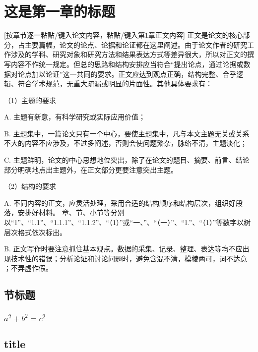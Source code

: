 \chapter{这是第一章的标题}
[按章节逐一粘贴/键入论文内容，粘贴/键入第1章正文内容]
正文是论文的核心部分，占主要篇幅，论文的论点、论据和论证都在这里阐述。由于论文作者的研究工作涉及的学科、研究对象和研究方法和结果表达方式等差异很大，所以对正文的撰写内容不作统一规定。但总的思路和结构安排应当符合“提出论点，通过论据或数据对论点加以论证”这一共同的要求。正文应达到观点正确，结构完整、合乎逻辑、符合学术规范，无重大疏漏或明显的片面性。其他具体要求有：

（1）主题的要求

A.	主题有新意，有科学研究或实际应用价值；

B.	主题集中，一篇论文只有一个中心，要使主题集中，凡与本文主题无关或关系不大的内容不应涉及，不过多阐述，否则会使问题繁杂，脉络不清，主题淡化；

C.	主题鲜明，论文的中心思想地位突出，除了在论文的题目、摘要、前言、结论部分明确地点出主题外，在正文部分更要注意突出主题。

（2）结构的要求

A.	不同内容的正文，应灵活处理，采用合适的结构顺序和结构层次，组织好段落，安排好材料。 章、节、小节等分别以“1”、“1.1”、“1.1.1”、“1.1.2”、“（1）”或“一、”、“（一）”、“1.”、“（1）”等数字以树层次格式依次标出。

B.	正文写作时要注意抓住基本观点。数据的采集、记录、整理、表达等均不应出现技术性的错误；分析论证和讨论问题时，避免含混不清，模棱两可，词不达意 ；不弄虚作假。

\section{节标题}
\zhlipsum[2-3]
\subsection{$a^2+b^2=c^2$}
\zhlipsum[5]

\section{title}
\zhlipsum[8]